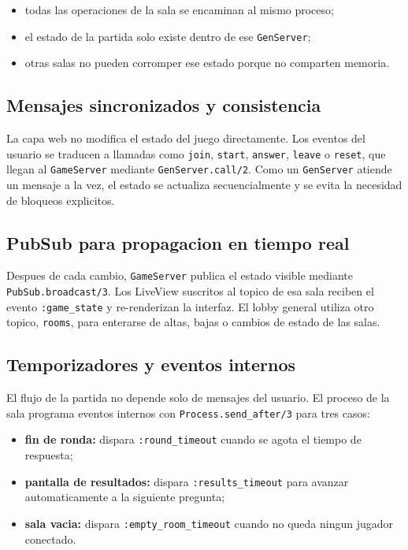 \documentclass[12pt,a4paper]{article}
\begin{document}
\begin{itemize}
  \item todas las operaciones de la sala se encaminan al mismo proceso;
  \item el estado de la partida solo existe dentro de ese \texttt{GenServer};
  \item otras salas no pueden corromper ese estado porque no comparten memoria.
\end{itemize}

\subsection{Mensajes sincronizados y consistencia}

La capa web no modifica el estado del juego directamente. Los eventos del
usuario se traducen a llamadas como \texttt{join}, \texttt{start},
\texttt{answer}, \texttt{leave} o \texttt{reset}, que llegan al
\texttt{GameServer} mediante \texttt{GenServer.call/2}. Como un
\texttt{GenServer} atiende un mensaje a la vez, el estado se actualiza
secuencialmente y se evita la necesidad de bloqueos explicitos.

\subsection{PubSub para propagacion en tiempo real}

Despues de cada cambio, \texttt{GameServer} publica el estado visible mediante
\texttt{PubSub.broadcast/3}. Los LiveView suscritos al topico de esa sala
reciben el evento \texttt{:game\_state} y re-renderizan la interfaz. El lobby
general utiliza otro topico, \texttt{rooms}, para enterarse de altas, bajas o
cambios de estado de las salas.

\subsection{Temporizadores y eventos internos}

El flujo de la partida no depende solo de mensajes del usuario. El proceso de
la sala programa eventos internos con \texttt{Process.send\_after/3} para tres
casos:

\begin{itemize}
  \item \textbf{fin de ronda:} dispara \texttt{:round\_timeout} cuando se agota
  el tiempo de respuesta;
  \item \textbf{pantalla de resultados:} dispara \texttt{:results\_timeout}
  para avanzar automaticamente a la siguiente pregunta;
  \item \textbf{sala vacia:} dispara \texttt{:empty\_room\_timeout} cuando no
  queda ningun jugador conectado.
\end{itemize}
\end{document}
